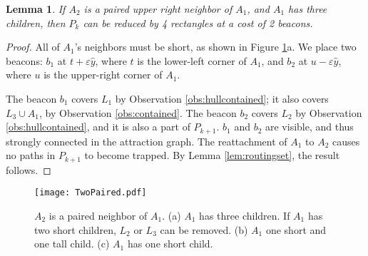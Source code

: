 \documentclass{article}
\newtheorem{lemma}{Lemma}
\begin{document}
		\begin{lemma}\label{lem:twopairedthree}
			If $A_2$ is a paired upper right neighbor of $A_1$, and $A_1$ has three
			children, then $P_k$ can be reduced by 4 rectangles at a cost of 2 beacons.
		\end{lemma}
		\begin{proof}
			All of $A_1$'s neighbors must be short, as shown in Figure
			\ref{fig:twopaired}a.
			We place two beacons: $b_1$ at $t + \varepsilon\hat{y}$, where $t$ is
			the lower-left corner of $A_1$, and $b_2$ at $u - \varepsilon\hat{y}$,
			where $u$ is the upper-right corner of $A_1$.
	
			The beacon $b_1$ covers $L_1$ by Observation \ref{obs:hullcontained};
			it also covers $L_3 \cup A_1$, by Observation \ref{obs:contained}.
			The beacon $b_2$ covers $L_2$ by Observation \ref{obs:hullcontained}, and
			it is also a part of $P_{k+1}$.
			$b_1$ and $b_2$ are visible, and thus
			strongly connected in the attraction graph.  
			The reattachment of $A_1$ to $A_2$ causes no paths in $P_{k+1}$ to become
			trapped. By Lemma \ref{lem:routingset}, the result follows.
		\end{proof} 
		
		\begin{figure}[htbp] 
			\begin{center}
				\texttt{[image: TwoPaired.pdf]} 
			\end{center}
			\caption{ 
				$A_2$ is a paired neighbor of $A_1$.
				(a) $A_1$ has three children. If $A_1$ has two short children,
				$L_2$ or $L_3$ can be removed.
				(b) $A_1$ one short and one tall child. 
				(c) $A_1$ has one short child.
			}
			\label{fig:twopaired}
		\end{figure}
		
\end{document}
